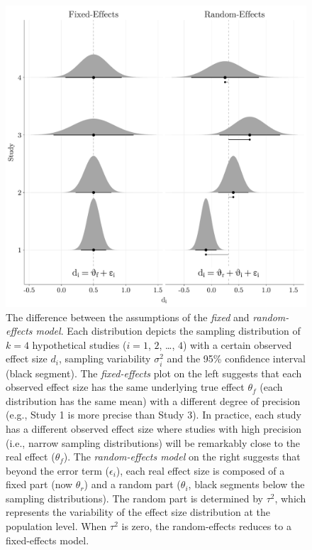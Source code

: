 \documentclass[
  man,floatsintext]{apa6}
\begin{document}
\begin{figure}[H]

{\centering \includegraphics[width=0.8\linewidth]{paper_files/figure-latex/img-fixed-vs-random-1} 

}

\caption{The difference between the assumptions of the \emph{fixed} and \emph{random-effects model}. Each distribution depicts the sampling distribution of \(k = 4\) hypothetical studies (\(i = 1\), \(2\), \ldots, \(4\)) with a certain observed effect size \(d_{i}\), sampling variability \(\sigma_{i}^{2}\) and the 95\% confidence interval (black segment). The \emph{fixed-effects} plot on the left suggests that each observed effect size has the same underlying true effect \(\theta_{f}\) (each distribution has the same mean) with a different degree of precision (e.g., Study 1 is more precise than Study 3). In practice, each study has a different observed effect size where studies with high precision (i.e., narrow sampling distributions) will be remarkably close to the real effect (\(\theta_{f}\)). The \emph{random-effects model} on the right suggests that beyond the error term (\(\epsilon_{i}\)), each real effect size is composed of a fixed part (now \(\theta_{r}\)) and a random part (\(\theta_{i}\), black segments below the sampling distributions). The random part is determined by \(\tau^{2}\), which represents the variability of the effect size distribution at the population level. When \(\tau^{2}\) is zero, the random-effects reduces to a fixed-effects model.}\label{fig:img-fixed-vs-random}
\end{figure}
\end{document}
